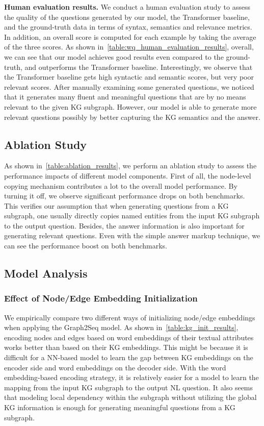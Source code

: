\documentclass[journal]{IEEEtran}
\begin{document}
\noindent\textbf{Human evaluation results.}
We conduct a human evaluation study to assess the quality of the questions generated by our model, the Transformer baseline, and the ground-truth data in terms of syntax, semantics and relevance metrics. 
In addition, an overall score is computed for each example by taking the average of the three scores.
As shown in~\cref{table:wq_human_evaluation_results},
overall, we can see that our model achieves good results even compared to the ground-truth, and outperforms the Transformer baseline.
Interestingly, we observe that the Transformer baseline gets high syntactic and semantic scores, but very poor relevant scores.
After manually examining some generated questions,
we noticed that it generates many fluent and meaningful questions that are by no means relevant to the given KG subgraph.
However, our model is able to generate more relevant questions possibly by better capturing the KG semantics and the answer.


 




\subsection{Ablation Study}
As shown in~\cref{table:ablation_results}, we perform an ablation study to assess the performance impacts of different model components.
First of all, the node-level copying mechanism contributes a lot to the overall model performance.
By turning it off, we observe significant performance drops on both benchmarks.
This verifies our assumption that when generating questions from a KG subgraph,
one usually directly copies named entities from the input KG subgraph to the output question.
Besides, the answer information is also important for generating relevant questions.
Even with the simple answer markup technique, we can see the performance boost on both benchmarks.




\subsection{Model Analysis}

\subsubsection{Effect of Node/Edge Embedding Initialization}\label{sec:node_edge_emb}
We empirically compare two different ways of initializing node/edge embeddings when applying the Graph2Seq model.
As shown in~\cref{table:kg_init_results},  encoding nodes and edges based on word embeddings of their textual attributes works better than based on their KG embeddings.
This might be because it is difficult for a NN-based model to learn the gap between KG embeddings on the encoder side and word embeddings on the decoder side.
 With the word embedding-based encoding strategy, it is relatively easier for a model to learn the mapping from the input KG subgraph to the output NL question.
 It also seems that modeling local dependency within the  subgraph without utilizing the global KG information 
 is enough for generating meaningful questions from a KG subgraph. 
\end{document}
